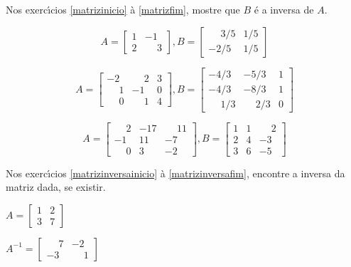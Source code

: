 \documentclass[12pt]{exam}
\begin{document}
Nos exerc{\'\i}cios \ref{matrizinicio} \`a \ref{matrizfim}, mostre que $B$ \'e a inversa de $A$.
\begin{exercicio}\label{matrizinicio}
  \[
    A =\begin{bmatrix}
      1 & -1\\
      2 & \phantom{-} 3
    \end{bmatrix}, B =\begin{bmatrix}
      \phantom{-} 3/5 & 1/5\\
      -2/5 & 1/5
    \end{bmatrix}
  \]
\end{exercicio}

\begin{exercicio}
  \[
    A =\begin{bmatrix}
      -2 & \phantom{-} 2 & 3\\
      \phantom{-} 1 & -1 & 0\\
      \phantom{-} 0 & \phantom{-} 1 & 4
    \end{bmatrix}, B =\begin{bmatrix}
      -4/3 & -5/3 & 1\\
      -4/3 & -8/3 & 1\\
      \phantom{-} 1/3 & \phantom{-} 2/3 & 0
    \end{bmatrix}
  \]
\end{exercicio}

\begin{exercicio}\label{matrizfim}
  \[
    A =\begin{bmatrix}
      \phantom{-} 2 & -17 & \phantom{-} 11\\
      -1 & 11 & -7\\
      \phantom{-} 0 & 3 & -2
    \end{bmatrix}, B =\begin{bmatrix}
      1 & 1 & \phantom{-} 2\\
      2 & 4 & -3\\
      3 & 6 & -5
    \end{bmatrix}
  \]
\end{exercicio}

Nos exerc{\'\i}cios \ref{matrizinversainicio} \`a \ref{matrizinversafim}, encontre a inversa da matriz dada, se existir.

\begin{exercicio}\label{matrizinversainicio}
  $
    A =\begin{bmatrix}
        1 & 2\\
        3 & 7
    \end{bmatrix}
  $
  \begin{solucao}
    $A^{-1} =\begin{bmatrix}
      \phantom{-} 7 & -2\\
      -3 & \phantom{-} 1
    \end{bmatrix}$
  \end{solucao}
\end{exercicio}
\end{document}
